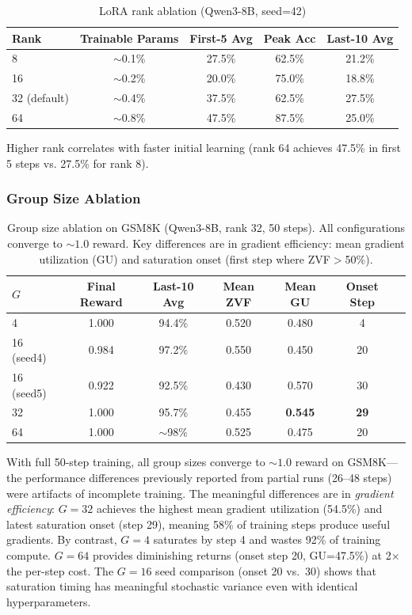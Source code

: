\documentclass{article}
\begin{document}
\begin{table}[htbp]
    \centering
    \caption{LoRA rank ablation (Qwen3-8B, seed=42)}
    \begin{tabular}{lcccc}
        \toprule
        Rank & Trainable Params & First-5 Avg & Peak Acc & Last-10 Avg \\
        \midrule
        8 & $\sim$0.1\% & 27.5\% & 62.5\% & 21.2\% \\
        16 & $\sim$0.2\% & 20.0\% & 75.0\% & 18.8\% \\
        32 (default) & $\sim$0.4\% & 37.5\% & 62.5\% & 27.5\% \\
        64 & $\sim$0.8\% & 47.5\% & 87.5\% & 25.0\% \\
        \bottomrule
    \end{tabular}
    \label{tab:lora_ablation}
\end{table}

Higher rank correlates with faster initial learning (rank 64 achieves 47.5\% in first 5 steps vs. 27.5\% for rank 8).

\subsubsection{Group Size Ablation}

\begin{table}[htbp]
    \centering
    \caption{Group size ablation on GSM8K (Qwen3-8B, rank 32, 50 steps). All configurations converge to ${\sim}1.0$ reward. Key differences are in gradient efficiency: mean gradient utilization (GU) and saturation onset (first step where ZVF${}>$50\%).}
    \begin{tabular}{lcccccc}
        \toprule
        $G$ & Final Reward & Last-10 Avg & Mean ZVF & Mean GU & Onset Step \\
        \midrule
        4  & 1.000 & 94.4\% & 0.520 & 0.480 & 4 \\
        16 (seed4) & 0.984 & 97.2\% & 0.550 & 0.450 & 20 \\
        16 (seed5) & 0.922 & 92.5\% & 0.430 & 0.570 & 30 \\
        32 & 1.000 & 95.7\% & 0.455 & \textbf{0.545} & \textbf{29} \\
        64 & 1.000 & $\sim$98\% & 0.525 & 0.475 & 20 \\
        \bottomrule
    \end{tabular}
    \label{tab:group_ablation}
\end{table}

With full 50-step training, all group sizes converge to ${\sim}1.0$ reward on GSM8K---the performance differences previously reported from partial runs (26--48 steps) were artifacts of incomplete training. The meaningful differences are in \emph{gradient efficiency}: $G{=}32$ achieves the highest mean gradient utilization (54.5\%) and latest saturation onset (step 29), meaning 58\% of training steps produce useful gradients. By contrast, $G{=}4$ saturates by step 4 and wastes 92\% of training compute. $G{=}64$ provides diminishing returns (onset step 20, GU=47.5\%) at 2$\times$ the per-step cost. The $G{=}16$ seed comparison (onset 20 vs.\ 30) shows that saturation timing has meaningful stochastic variance even with identical hyperparameters.
\end{document}
